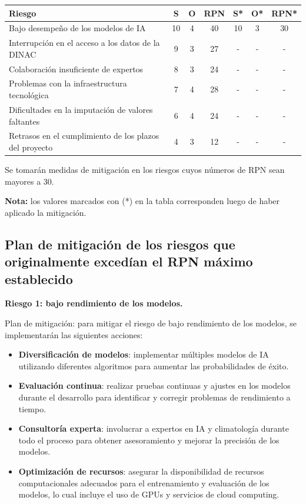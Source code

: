 \documentclass[
11pt, %
codirector, %
]{charter}
\begin{document}
\begin{table}[htpb]
\centering
\begin{tabularx}{\linewidth}{@{}|X|c|c|c|c|c|c|@{}}
\hline
\rowcolor[HTML]{C0C0C0} 
Riesgo & S & O & RPN & S* & O* & RPN* \\ \hline
Bajo desempeño de los modelos de IA & 10 & 4 & 40 & 10 & 3 & 30 \\ \hline
Interrupción en el acceso a los datos de la DINAC & 9 & 3 & 27 & - & - & - \\ \hline
Colaboración insuficiente de expertos & 8 & 3 & 24 & - & - & - \\ \hline
Problemas con la infraestructura tecnológica & 7 & 4 & 28 & - & - & - \\ \hline
Dificultades en la imputación de valores faltantes & 6 & 4 & 24 & - & - & - \\ \hline
Retrasos en el cumplimiento de los plazos del proyecto & 4 & 3 & 12 & - & - & - \\ \hline
\end{tabularx}%
\end{table}

Se tomarán medidas de mitigación en los riesgos cuyos números de RPN sean mayores a 30.

\textbf{Nota:} los valores marcados con (*) en la tabla corresponden luego de haber aplicado la mitigación.

\subsection{Plan de mitigación de los riesgos que originalmente excedían el RPN máximo establecido}

\textbf{Riesgo 1: bajo rendimiento de los modelos.}

Plan de mitigación: para mitigar el riesgo de bajo rendimiento de los modelos, se implementarán las siguientes acciones:
\begin{itemize}
    \item \textbf{Diversificación de modelos}: implementar múltiples modelos de IA utilizando diferentes algoritmos para aumentar las probabilidades de éxito.
    \item \textbf{Evaluación continua}: realizar pruebas continuas y ajustes en los modelos durante el desarrollo para identificar y corregir problemas de rendimiento a tiempo.
    \item \textbf{Consultoría experta}: involucrar a expertos en IA y climatología durante todo el proceso para obtener asesoramiento y mejorar la precisión de los modelos.
    \item \textbf{Optimización de recursos}: asegurar la disponibilidad de recursos computacionales adecuados para el entrenamiento y evaluación de los modelos, lo cual incluye el uso de GPUs y servicios de cloud computing.
\end{itemize}
\end{document}
